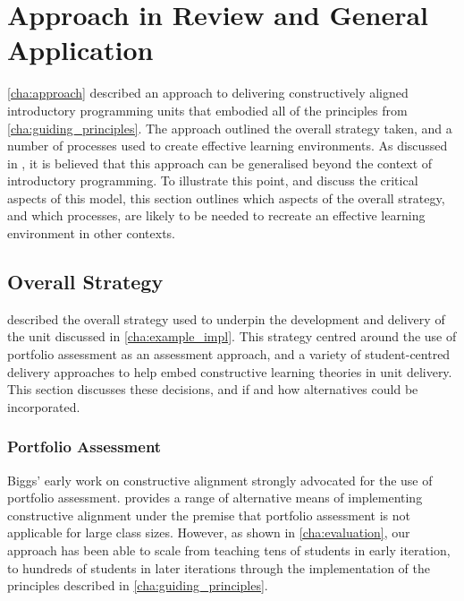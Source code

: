 


\section{Approach in Review and General Application} %
\label{sec:approach_in_review}

\cref{cha:approach} described an approach to delivering constructively aligned introductory programming units that embodied all of the principles from \cref{cha:guiding_principles}. The approach outlined the overall strategy taken, and a number of processes used to create effective learning environments. As discussed in , it is believed that this approach can be generalised beyond the context of introductory programming. To illustrate this point, and discuss the critical aspects of this model, this section outlines which aspects of the overall strategy, and which processes, are likely to be needed to recreate an effective learning environment in other contexts.

\subsection{Overall Strategy} %
\label{sub:overall_strategy}

 described the overall strategy used to underpin the development and delivery of the unit discussed in \cref{cha:example_impl}. This strategy centred around the use of portfolio assessment as an assessment approach, and a variety of  student-centred delivery approaches to help embed constructive learning theories in unit delivery. This section discusses these decisions, and if and how alternatives could be incorporated.

\subsubsection{Portfolio Assessment} %
 \label{ssub:portfolio_assessment}

Biggs' early work on constructive alignment \cite{Biggs:1996c,Biggs:1999} strongly advocated for the use of portfolio assessment. \citet{Biggs:2007} provides a range of alternative means of implementing constructive alignment under the premise that portfolio assessment is not applicable for large class sizes. However, as shown in \cref{cha:evaluation}, our approach has been able to scale from teaching tens of students in early iteration, to hundreds of students in later iterations through the implementation of the principles described in \cref{cha:guiding_principles}.

